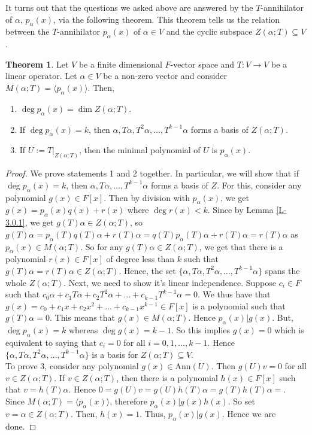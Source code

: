\documentclass[letterpaper,11pt,twoside]{article}
\theoremstyle{definition}
\theoremstyle{definition}
\newtheorem{theorem}[proposition]{Theorem}
\theoremstyle{definition}
\theoremstyle{definition}
\theoremstyle{definition}
\theoremstyle{definition}
\theoremstyle{remark}
\theoremstyle{definition}
\newcommand{\rest}[2]{\left. { #1 }\right \vert_{#2}}
\newcommand{\Ann}[1]{\text{Ann}\left(#1\right)}
\newcommand{\gen}[1]{\langle #1\rangle}
\begin{document}
    It turns out that the questions we asked above are answered by the $T$-annihilator of $\alpha$, $p_\alpha(x)$, via the following theorem. This theorem tells us the relation between the $T$-annihilator $p_\alpha(x)$ of $\alpha \in V$ and the cyclic subspace $Z(\alpha;T) \subseteq V$.
    \begin{theorem}\label{T-3.0.2}
    Let $V$ be a finite dimensional $F$-vector space and $T : V\to  V$ be a linear operator. Let $\alpha \in V$ be a non-zero vector and consider $M(\alpha;T) = \gen{p_\alpha(x)}$. Then,
    \begin{enumerate}
        \item {$\deg p_\alpha(x) = \dim Z(\alpha;T)$.}
        \item {If $\deg p_\alpha(x) = k$, then $\alpha, T\alpha, T^2\alpha ,\dots, T^{k-1}\alpha$ forms a basis of $Z(\alpha;T)$.}
        \item{If $U := \rest{T}{Z(\alpha;T)}$, then the minimal polynomial of $U$ is $p_\alpha(x)$.}
    \end{enumerate}
    \end{theorem}
    \begin{proof}
        We prove statements 1 and 2 together. In particular, we will show that if $\deg p_\alpha(x) = k$, then $\alpha, T\alpha ,\dots , T^{k-1}\alpha$ forms a basis of $Z$. For this, consider any polynomial $g(x) \in F[x]$. Then by division with $p_\alpha(x)$, we get $g(x) = p_\alpha(x) q(x) + r(x)$ where $\deg r(x) < k$. Since by Lemma \ref{L-3.0.1}, we get $g(T)\alpha\in Z(\alpha;T)$, so $g(T)\alpha = p_\alpha(T)q(T)\alpha + r(T)\alpha = q(T)p_\alpha(T)\alpha +r(T)\alpha = r(T)\alpha$ as $p_\alpha(x) \in M(\alpha;T)$. So for any $g(T)\alpha\in Z(\alpha;T)$, we get that there is a polynomial $r(x) \in F[x]$ of degree less than $k$ such that $g(T)\alpha = r(T)\alpha \in Z(\alpha;T)$. Hence, the set $\{\alpha,T\alpha,T^2\alpha,\dots,T^{k-1}\alpha\}$ spans the whole $Z(\alpha;T)$. Next, we need to show it's linear independence. Suppose $c_i \in F$ such that $c_0\alpha + c_1 T\alpha + c_2 T^2\alpha + \dots + c_{k-1}T^{k-1}\alpha = 0$. We thus have that $g(x) = c_0 + c_1 x +c_2 x^2 + \dots + c_{k-1}x^{k-1} \in F[x]$ is a polynomial such that $g(T)\alpha = 0$. This means that $g(x) \in M(\alpha;T)$. Hence $p_\alpha(x) | g(x)$. But, $\deg p_\alpha(x) = k$ whereas $\deg g(x) = k-1$. So this implies $g(x) = 0$ which is equivalent to saying that $c_i = 0$ for all $i=0,1,\dots,k-1$. Hence $\{\alpha,T\alpha,T^2\alpha,\dots,T^{k-1}\alpha\}$ is a basis for $Z(\alpha;T)\subseteq V$.\\
        
        To prove 3, consider any polynomial $g(x) \in \Ann{U}$. Then $g(U)v = 0$ for all $v\in Z(\alpha;T)$. If $v\in Z(\alpha;T)$, then there is a polynomial $h(x)\in F[x]$ such that $v = h(T)\alpha$. Hence $0=g(U)v = g(U)h(T)\alpha = g(T)h(T)\alpha = $. Since $M(\alpha;T) = \gen{p_\alpha(x)}$, therefore $p_\alpha(x) | g(x)h(x)$. So set $v = \alpha\in Z(\alpha;T)$. Then, $h(x) = 1$. Thus, $p_\alpha(x) | g(x)$. Hence we are done.
    \end{proof}
\end{document}
